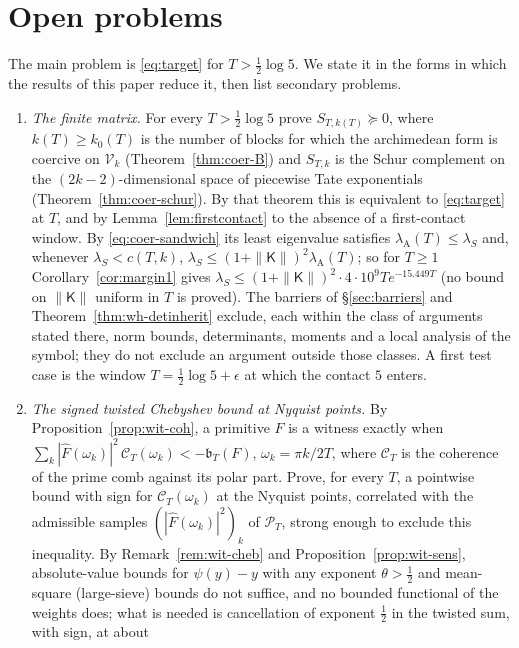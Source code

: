 \documentclass[11pt]{amsart}
\theoremstyle{definition}
\theoremstyle{remark}
\newcommand{\PT}{\mathcal P_T}
\newcommand{\lamA}{\lambda_{\mathrm A}(T)}
\newcommand{\Fh}{\widehat F}
\begin{document}
\section{Open problems}\label{sec:open}

The main problem is \eqref{eq:target} for $T>\frac12\log5$. We state it in the forms in which the results of
this paper reduce it, then list secondary problems.

\begin{enumerate}
\item[(L2)] \emph{The finite matrix.} For every $T>\frac12\log5$ prove $S_{T,k(T)}\succeq0$, where $k(T)\ge k_0(T)$ is
the number of blocks for which the archimedean form is coercive on $\mathcal V_k$ (Theorem~\ref{thm:coer-B}) and
$S_{T,k}$ is the Schur complement on the $(2k-2)$-dimensional space of piecewise Tate exponentials
(Theorem~\ref{thm:coer-schur}). By that theorem this is equivalent to \eqref{eq:target} at $T$, and by
Lemma~\ref{lem:firstcontact} to the absence of a first-contact window. By \eqref{eq:coer-sandwich} its least
eigenvalue satisfies $\lamA\le\lambda_S$ and, whenever $\lambda_S<c(T,k)$, $\lambda_S\le(1+\|\mathsf K\|)^2\lamA$; so for
$T\ge1$ Corollary~\ref{cor:margin1} gives $\lambda_S\le(1+\|\mathsf K\|)^2\cdot4\cdot10^9Te^{-15.449T}$ (no bound on
$\|\mathsf K\|$ uniform in $T$ is proved). The barriers of \S\ref{sec:barriers} and
Theorem~\ref{thm:wh-detinherit} exclude, each within the class of arguments stated there, norm bounds,
determinants, moments and a local analysis of the symbol; they do not exclude an argument outside those
classes. A first test case is
the window $T=\frac12\log5+\epsilon$ at which the contact $5$ enters.
\item[(N)] \emph{The signed twisted Chebyshev bound at Nyquist points.} By Proposition~\ref{prop:wit-coh}, a
primitive $F$ is a witness exactly when $\sum_k|\Fh(\omega_k)|^2\,\mathcal C_T(\omega_k)<-\mathfrak b_T(F)$,
$\omega_k=\pi k/2T$, where $\mathcal C_T$ is the coherence of the prime comb against its polar part. Prove, for
every $T$, a pointwise bound with sign for $\mathcal C_T(\omega_k)$ at the Nyquist points, correlated with the
admissible samples $(|\Fh(\omega_k)|^2)_k$ of $\PT$, strong enough to exclude this inequality. By
Remark~\ref{rem:wit-cheb} and Proposition~\ref{prop:wit-sens}, absolute-value bounds for $\psi(y)-y$ with any
exponent $\theta>\frac12$ and mean-square (large-sieve) bounds do not suffice, and no bounded functional of the
weights does; what is needed is cancellation of exponent $\frac12$ in the twisted sum, with sign, at about

\end{enumerate}
\end{document}

